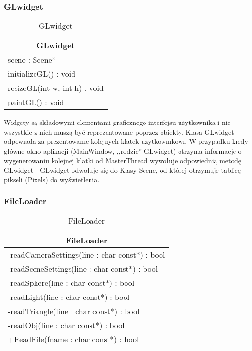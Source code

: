 \subsubsection{GLwidget}

\footnotesize
\begin{longtable}{|p{14cm}|}
    \caption{GLwidget} \label{tab:GLwidget} \\ \hline
    \multicolumn{1}{|c|}{GLwidget} \\ \hline
    scene : Scene*  \\ \hline
    initializeGL() : void \\ 
    resizeGL(int w, int h) : void \\
    paintGL() : void \\ \hline
\end{longtable}
\normalsize

Widgety są składowymi elementami graficznego interfejsu użytkownika i nie wszystkie z nich muszą być reprezentowane poprzez obiekty. Klasa GLwidget odpowiada za prezentowanie kolejnych klatek użytkownikowi. W przypadku kiedy główne okno aplikacji (MainWindow, ,,rodzic'' GLwidget) otrzyma informacje o wygenerowaniu kolejnej klatki od MasterThread wywołuje odpowiednią metodę GLwidget - GLwidget odwołuje się do Klasy Scene, od której otrzymuje tablicę pikseli (Pixels) do wyświetlenia. 

\subsubsection{FileLoader}

\footnotesize
\begin{longtable}{|p{14cm}|}
    \caption{FileLoader} \label{tab:FileLoader} \\ \hline
    \multicolumn{1}{|c|}{FileLoader} \\ \hline
    -readCameraSettings(line : char const*) : bool \\
    -readSceneSettings(line : char const*) : bool \\
    -readSphere(line : char const*) : bool \\
    -readLight(line : char const*) : bool \\
    -readTriangle(line : char const*) : bool \\
    -readObj(line : char const*) : bool \\
	+ReadFile(fname : char const*) : bool \\ \hline
\end{longtable}
\normalsize

